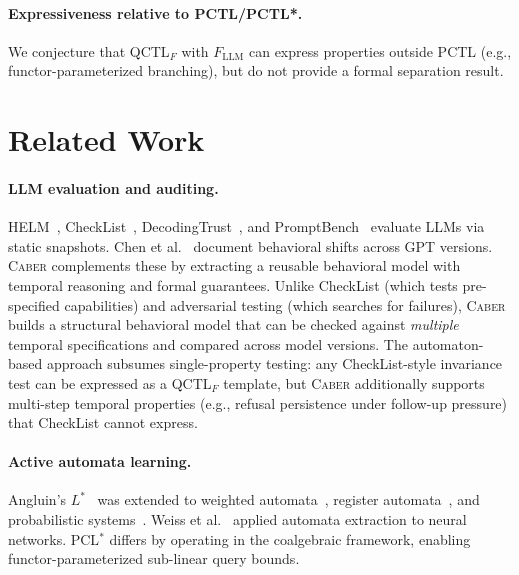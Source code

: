 \documentclass[11pt]{article}
\newcommand{\tool}{\textsc{Caber}}
\newcommand{\pclstar}{PCL$^*$}
\newcommand{\qctlf}{QCTL$_F$}
\begin{document}
\paragraph{Expressiveness relative to PCTL/PCTL*.}
We conjecture that \qctlf{} with $F_{\mathrm{LLM}}$ can express
properties outside PCTL (e.g., functor-parameterized branching), but
do not provide a formal separation result.

\section{Related Work}\label{sec:related}

\paragraph{LLM evaluation and auditing.}
HELM~\cite{liang2023helm}, CheckList~\cite{ribeiro2020beyond},
DecodingTrust~\cite{wang2023decodingtrust}, and
PromptBench~\cite{zhu2023promptbench} evaluate LLMs via static
snapshots.  Chen et al.~\cite{chen2023chatgpt} document behavioral
shifts across GPT versions.
\tool{} complements these by extracting a reusable behavioral model
with temporal reasoning and formal guarantees.  Unlike CheckList
(which tests pre-specified capabilities) and adversarial testing
(which searches for failures), \tool{} builds a structural behavioral
model that can be checked against \emph{multiple} temporal
specifications and compared across model versions.  The
automaton-based approach subsumes single-property testing: any
CheckList-style invariance test can be expressed as a \qctlf{}
template, but \tool{} additionally supports multi-step temporal
properties (e.g., refusal persistence under follow-up pressure)
that CheckList cannot express.

\paragraph{Active automata learning.}
Angluin's $L^*$~\cite{angluin1987learning} was extended to weighted
automata~\cite{berstel2011noncommutative}, register
automata~\cite{howar2012inferring}, and probabilistic
systems~\cite{tappler2019model}.  Weiss et al.~\cite{weiss2018extracting}
applied automata extraction to neural networks.
\pclstar{} differs by operating in the coalgebraic framework, enabling
functor-parameterized sub-linear query bounds.
\end{document}
